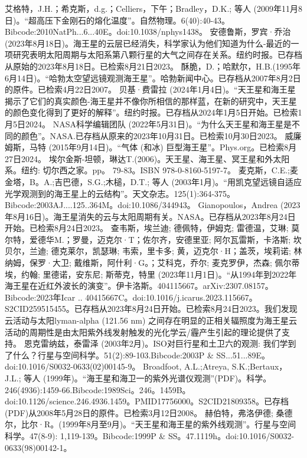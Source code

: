 \begin{enumerate}
 艾格特，J.H.；希克斯，d.g.；Celliers，下午；Bradley，D.K.; 等人 (2009年11月8日)。“超高压下金刚石的熔化温度”。自然物理。6(40):40-43。Bibcode:2010NatPh...6...40E。doi:10.1038/nphys1438。
 安德鲁斯，罗宾·乔治 (2023年8月18日)。海王星的云层已经消失，科学家认为他们知道为什么-最近的一项研究表明太阳周期与太阳系第八颗行星的大气之间存在关系。纽约时报。已存档从原始的2023年8月18日。已检索8月21日2023。
 酥脆，D.；哈默尔，H.B.(1995年6月14日)。“哈勃太空望远镜观测海王星”。哈勃新闻中心。已存档从2007年8月2日的原件。已检索4月22日2007。
 贝基·费雷拉 (2024年1月4日)。“天王星和海王星揭示了它们的真实颜色-海王星并不像你所相信的那样蓝，在新的研究中，天王星的颜色变化得到了更好的解释”。纽约时报。已存档从2024年1月5日开始。已检索1月5日2024。
 NASA科学编辑团队 (2022年5月31日)。“为什么天王星和海王星是不同的颜色”。NASA.已存档从原来的2023年10月31日。已检索10月30日2023。
 威廉姆斯，马特 (2015年9月14日)。“气体 (和冰) 巨型海王星”。Phys.org。已检索8月27日2024。
 埃尔金斯-坦顿，琳达T.(2006)。天王星、海王星、冥王星和外太阳系。纽约: 切尔西之家。pp。 79-83。ISBN 978-0-8160-5197-7。
 麦克斯，C.E.;麦金塔，B。A.;吉巴德，S.G.;木槌，D.T.; 等人 (2003年1月)。“用凯克望远镜自适应光学观测到的海王星上的云结构”。天文杂志。125(1):364-375。Bibcode:2003AJ....125..364M。doi:10.1086/344943。
 Gianopoulos，Andrea (2023年8月16日)。海王星消失的云与太阳周期有关。NASA。已存档从2023年8月24日开始。已检索8月24日2023。
 查韦斯，埃兰迪; 德佩特，伊姆克; 雷德温，艾琳; 莫尔特，爱德华M.；罗曼，迈克尔·T；佐尔齐，安德里亚; 阿尔瓦雷斯，卡洛斯; 坎贝尔，兰迪; 德克莱尔，凯瑟琳; 韦索，里卡多; 黄，迈克尔·H；盖茨，埃莉诺; 林纳姆，保罗·大卫; 戴维斯，阿什利·G。；艾科克，乔尔; 麦克罗伊，杰森; 佩尔蒂埃，约翰; 里德诺，安东尼; 斯蒂克，特里 (2023年11月1日)。“从1994年到2022年海王星在近红外波长的演变”。伊卡洛斯。404115667。arXiv:2307.08157。Bibcode:2023年Icar .. 40415667C。doi:10.1016/j.icarus.2023.115667。S2CID259515455。已存档从2023年8月24日开始。已检索8月24日2023。我们发现云活动与太阳lyman-alpha (121.56 nm) 之间存在明显的正相关辐照度为海王星云活动的周期性是由太阳紫外线发射触发的光化学云/霾产生引起的理论提供了支持。 
 恩克雷纳兹，泰雷泽 (2003年2月)。ISO对巨行星和土卫六的观测: 我们学到了什么？行星与空间科学。51(2):89-103.Bibcode:2003P & SS...51...89E。doi:10.1016/S0032-0633(02)00145-9。
 Broadfoot, A.L.;Atreya, S.K.;Bertaux，J.L.; 等人 (1999年)。“海王星和海卫一的紫外光谱仪观测”(PDF)。科学。246(4936):1459-66.Bibcode:1989Sci。246。1459B。doi:10.1126/science.246.4936.1459。PMID17756000。S2CID21809358。已存档(PDF)从2008年5月28日的原件。已检索3月12日2008。   
 赫伯特，弗洛伊德; 桑德尔，比尔·R。(1999年8月至9月)。“天王星和海王星的紫外线观测”。行星与空间科学。47(8-9): 1,119-139。Bibcode:1999P & SS。47.1119h。doi:10.1016/S0032-0633(98)00142-1。

\end{enumerate}
